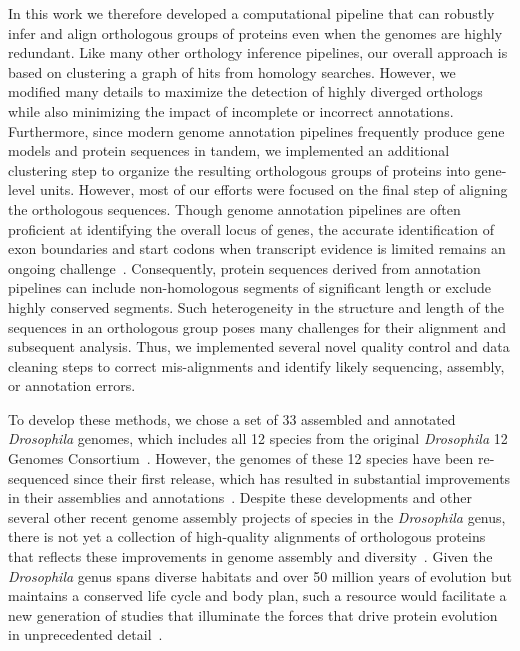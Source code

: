 In this work we therefore developed a computational pipeline that can robustly infer and align orthologous groups of proteins even when the genomes are highly redundant. Like many other orthology inference pipelines, our overall approach is based on clustering a graph of hits from homology searches. However, we modified many details to maximize the detection of highly diverged orthologs while also minimizing the impact of incomplete or incorrect annotations. Furthermore, since modern genome annotation pipelines frequently produce gene models and protein sequences in tandem, we implemented an additional clustering step to organize the resulting orthologous groups of proteins into gene-level units. However, most of our efforts were focused on the final step of aligning the orthologous sequences. Though genome annotation pipelines are often proficient at identifying the overall locus of genes, the accurate identification of exon boundaries and start codons when transcript evidence is limited remains an ongoing challenge~\cite{Frankish2015, Dunne2018}. Consequently, protein sequences derived from annotation pipelines can include non-homologous segments of significant length or exclude highly conserved segments. Such heterogeneity in the structure and length of the sequences in an orthologous group poses many challenges for their alignment and subsequent analysis. Thus, we implemented several novel quality control and data cleaning steps to correct mis-alignments and identify likely sequencing, assembly, or annotation errors.

To develop these methods, we chose a set of 33 assembled and annotated \textit{Drosophila} genomes, which includes all 12 species from the original \textit{Drosophila} 12 Genomes Consortium~\cite{D12GC2007}. However, the genomes of these 12 species have been re-sequenced since their first release, which has resulted in substantial improvements in their assemblies and annotations~\cite{Yang2018, Miller2018}. Despite these developments and other several other recent genome assembly projects of species in the \textit{Drosophila} genus, there is not yet a collection of high-quality alignments of orthologous proteins that reflects these improvements in genome assembly and diversity~\cite{Kim2021}. Given the \textit{Drosophila} genus spans diverse habitats and over 50 million years of evolution but maintains a conserved life cycle and body plan, such a resource would facilitate a new generation of studies that illuminate the forces that drive protein evolution in unprecedented detail~\cite{Wiegmann2011, Obbard2012}.

